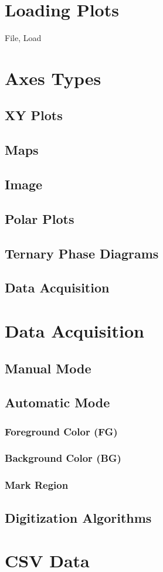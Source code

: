 \documentclass{article}
\begin{document}
\section{Loading Plots}
File, Load
\section{Axes Types}
\subsection{XY Plots}
\subsection{Maps}
\subsection{Image}
\subsection{Polar Plots}
\subsection{Ternary Phase Diagrams}
\subsection{Data Acquisition}
\section{Data Acquisition}
\subsection{Manual Mode}
\subsection{Automatic Mode}
\subsubsection{Foreground Color (FG)}
\subsubsection{Background Color (BG)}
\subsubsection{Mark Region}
\subsection{Digitization Algorithms}
\section{CSV Data}
\end{document}
